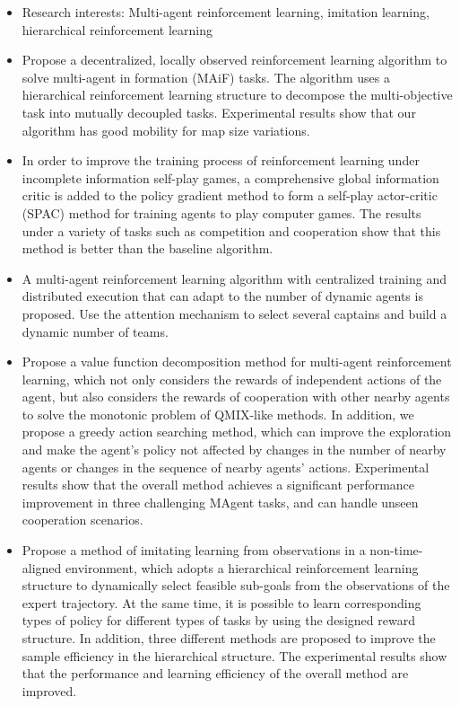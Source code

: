 
{\small
  \begin{itemize}
    \item Research interests: Multi-agent reinforcement learning, imitation learning, hierarchical reinforcement learning
    \item Propose a decentralized, locally observed reinforcement learning algorithm to solve multi-agent in formation (MAiF) tasks. The algorithm uses a hierarchical reinforcement learning structure to decompose the multi-objective task into mutually decoupled tasks. Experimental results show that our algorithm has good mobility for map size variations.
    \item In order to improve the training process of reinforcement learning under incomplete information self-play games, a comprehensive global information critic is added to the policy gradient method to form a self-play actor-critic (SPAC) method for training agents to play computer games. The results under a variety of tasks such as competition and cooperation show that this method is better than the baseline algorithm.

    \item A multi-agent reinforcement learning algorithm with centralized training and distributed execution that can adapt to the number of dynamic agents is proposed. Use the attention mechanism to select several captains and build a dynamic number of teams.

    \item Propose a value function decomposition method for multi-agent reinforcement learning, which not only considers the rewards of independent actions of the agent, but also considers the rewards of cooperation with other nearby agents to solve the monotonic problem of QMIX-like methods. In addition, we propose a greedy action searching method, which can improve the exploration and make the agent's policy not affected by changes in the number of nearby agents or changes in the sequence of nearby agents' actions. Experimental results show that the overall method achieves a significant performance improvement in three challenging MAgent tasks, and can handle unseen cooperation scenarios.
    \item Propose a method of imitating learning from observations in a non-time-aligned environment, which adopts a hierarchical reinforcement learning structure to dynamically select feasible sub-goals from the observations of the expert trajectory. At the same time, it is possible to learn corresponding types of policy for different types of tasks by using the designed reward structure. In addition, three different methods are proposed to improve the sample efficiency in the hierarchical structure. The experimental results show that the performance and learning efficiency of the overall method are improved.
  \end{itemize}
}

